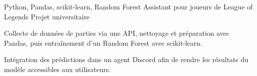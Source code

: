 
\begin{cventries}
  \cventry
    {Python, Pandas, scikit-learn, Random Forest}
    {Assistant pour joueurs de League of Legends}
    {Projet universitaire}
    {}
    {
      \begin{cvitems}
        \item {Collecte de données de parties via une API, nettoyage et préparation avec Pandas, puis entraînement d’un Random Forest avec scikit-learn.}
        \item {Intégration des prédictions dans un agent Discord afin de rendre les résultats du modèle accessibles aux utilisateurs.}
      \end{cvitems}
    }
\end{cventries}
